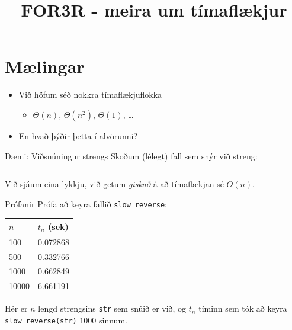 \documentclass{beamer}
\title{FOR3R - meira um tímaflækjur}
\begin{document}
\section{Mælingar}

\begin{frame}
\titlepage
\end{frame}

\begin{frame}
\begin{itemize}
 \item Við höfum séð nokkra tímaflækjuflokka
 \begin{itemize}
  \item $\Theta(n)$, $\Theta(n^2)$, $\Theta(1)$, \ldots
 \end{itemize}
 \item En hvað þýðir þetta í alvörunni?
\end{itemize}
\end{frame}

\begin{frame}[fragile]{Dæmi: Viðsnúningur strengs}
Skoðum (lélegt) fall sem snýr við streng:

\inputminted{python}{Code/Python/slow_reverse.py}

Við sjáum eina lykkju, við getum \emph{giskað} á að tímaflækjan sé $O(n)$.
\end{frame}

\begin{frame}{Prófanir}
Prófa að keyra fallið \texttt{slow\_reverse}:
\begin{center}
\begin{tabular}{ll}
\toprule
$n$&$t_n$ (sek)\\
\midrule
100&0.072868\\
500&0.332766\\
1000&0.662849\\
10000&6.661191\\
\bottomrule
\end{tabular}
\end{center}
Hér er $n$ lengd strengsins \texttt{str} sem snúið er við, og $t_n$ tíminn sem tók að keyra \texttt{slow\_reverse(str)} $1000$ sinnum.
\end{frame}
\end{document}
